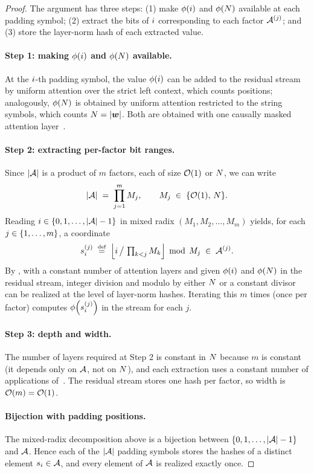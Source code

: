 \documentclass{article}
\begin{document}
\begin{proof}
    The argument has three steps: (1) make $\phi({{ i}})$ and $\phi({{ N}})$ available at each padding symbol; (2) extract the bits of ${{ i}}$ corresponding to each factor ${{{{ \mathcal{A}}}}}^{(j)}$; and (3) store the layer-norm hash of each extracted value.
    
    \paragraph{Step 1: making $\phi({{ i}})$ and $\phi({{ N}})$ available.}
    At the ${{ i}}$-th padding symbol, the value $\phi({{ i}})$ can be added to the residual stream by uniform attention over the strict left context, which counts positions; analogously, $\phi({{ N}})$ is obtained by uniform attention restricted to the string symbols, which counts ${{ N}} = |{{\boldsymbol{w}}}|$.
    Both are obtained with one causally masked attention layer~\citep{merrill2024expressivepowertransformerschain}.
    
    \paragraph{Step 2: extracting per-factor bit ranges.}
    Since $\asetsize$ is a product of $m$ factors, each of size ${{ \mathcal{O}}}(1)$ or ${{ N}}$, we can write
\[
    \asetsize \;=\; \prod_{j=1}^{m} M_j,
    \qquad
    M_j \;\in\; \set{\bigo(1),\, \idxn}.
\]
    Reading $\idxi \in \set{0, 1, \ldots, \asetsize-1}$ in mixed radix $(M_1, M_2, \ldots, M_m)$ yields, for each $j \in {{\{ 1, \ldots, m \}}}$, a coordinate
\[
    \asetelem^{(j)}_\idxi \;\defeq\; \mleft\lfloor \idxi \,\big/\, \textstyle\prod_{k<j} M_k \mright\rfloor \,\bmod\, M_j \;\in\; \aset^{(j)}.
\]
    By \citealp[][Lem. 1]{merrill-2025littledepthgoeslong}, with a constant number of attention layers and given $\phi({{ i}})$ and $\phi({{ N}})$ in the residual stream, integer division and modulo by either ${{ N}}$ or a constant divisor can be realized at the level of layer-norm hashes.
    Iterating this $m$ times (once per factor) computes $\phi\mleft(\asetelem^{(j)}_\idxi\mright)$ in the stream for each $j$.
    
    \paragraph{Step 3: depth and width.}
    The number of layers required at Step 2 is constant in ${{ N}}$ because $m$ is constant (it depends only on ${{{{ \mathcal{A}}}}}$, not on ${{ N}}$), and each extraction uses a constant number of applications of~\citealp[][Lem. 1]{merrill-2025littledepthgoeslong}.
    The residual stream stores one hash per factor, so width is ${{ \mathcal{O}}}(m) = {{ \mathcal{O}}}(1)$.
    
    \paragraph{Bijection with padding positions.}
    The mixed-radix decomposition above is a bijection between $\set{0, 1, \ldots, \asetsize-1}$ and ${{{{ \mathcal{A}}}}}$.
    Hence each of the $\asetsize$ padding symbols stores the hashes of a distinct element ${s}_{{ i}} \in {{{{ \mathcal{A}}}}}$, and every element of ${{{{ \mathcal{A}}}}}$ is realized exactly once.
\end{proof}
\end{document}
